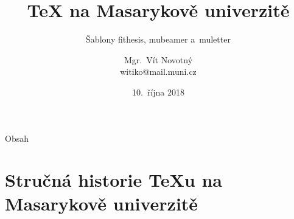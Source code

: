 \documentclass[
  aspectratio=169,
]{beamer}
\begin{document}
\title[\TeX{} na MU]{\TeX{} na Masarykově univerzitě}
\subtitle{Šablony fithesis, mubeamer a~muletter}
\author[V.\,Novotný]{Mgr.\ Vít Novotný \\ witiko@mail.muni.cz}
\date{10.\ října 2018}
\subject{TeX na Masarykově univerzitě}

\begin{frame}[plain]
\maketitle
{}
\end{frame}

\begin{frame}{Obsah}
\tableofcontents
\end{frame}

\section[Stručná historie \TeX u na MU]{Stručná historie \TeX u na Masarykově univerzitě}
\end{document}
